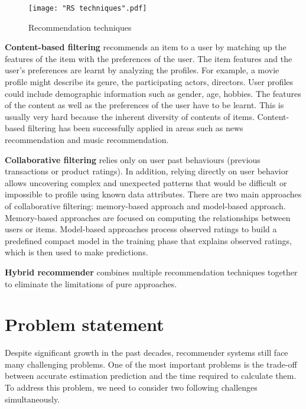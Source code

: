 \documentclass[oneside,13pt]{extreport}
\begin{document}
\begin{figure}[h!]
\centering
\texttt{[image: "RS techniques".pdf]}
\caption{Recommendation techniques}
\label{fig:RS_techniques}
\end{figure}

\begin{description}
    \item{\textbf{Content-based filtering}} recommends an item to a user by matching up the features of the item with the preferences of the user. The item features and the user's preferences are learnt by analyzing the profiles. For example, a movie profile might describe its genre, the participating actors, directors. User profiles could include demographic information such as gender, age, hobbies. The features of the content as well as the preferences of the user have to be learnt. This is usually very hard because the inherent diversity of contents of items. Content-based filtering has been successfully applied in areas such as news recommendation and music recommendation.
    \item{\textbf{Collaborative filtering}} relies only on user past behaviours (previous transactions or product ratings). In addition, relying directly on user behavior allows uncovering complex and unexpected patterns that would be difficult or impossible to profile using known data attributes\cite{BellKorFactor}. There are two main approaches of collaborative filtering: memory-based approach and model-based approach. Memory-based approaches are focused on computing the relationships between users or items. Model-based approaches process observed ratings to build a predefined compact model in the training phase that explains observed ratings, which is then used to make predictions.
    \item{\textbf{Hybrid recommender}} combines multiple recommendation techniques together to eliminate the limitations of pure approaches\cite{TranHybrib}.
\end{description}


\section{Problem statement}
Despite significant growth in the past decades, recommender systems still face many challenging problems. One of the most important problems is the trade-off between accurate estimation prediction and the time required to calculate them.  To address this problem, we need to consider two following challenges simultaneously.
\end{document}
